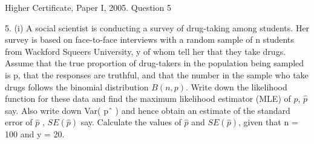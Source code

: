 \documentclass[a4paper,12pt]{article}
\begin{document}
Higher Certificate, Paper I, 2005. Question 5

\begin{framed}
5. (i) A social scientist is conducting a survey of drug-taking among students. Her
survey is based on face-to-face interviews with a random sample of n students
from Wackford Squeers University, y of whom tell her that they take drugs.
Assume that the true proportion of drug-takers in the population being sampled
is p, that the responses are truthful, and that the number in the sample who take
drugs follows the binomial distribution $B(n, p)$. Write down the likelihood
function for these data and find the maximum likelihood estimator (MLE) of $p$,
$\hat{p}$ say. Also write down Var( pˆ ) and hence obtain an estimate of the standard
error of $\hat{p}$ , $SE(\hat{p})$ say. Calculate the values of $\hat{p}$ and $SE(\hat{p})$, given that
n = 100 and y = 20.
\end{framed}
\end{document}
